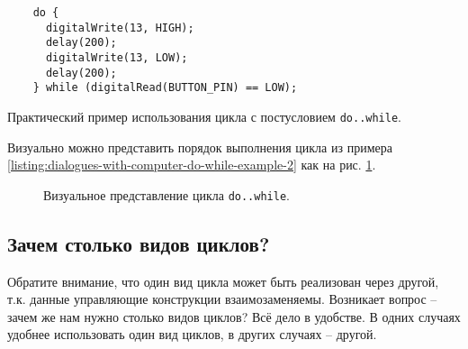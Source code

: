 \documentclass[../sparc.tex]{subfiles}
\begin{document}
\begin{listing}[ht]
  \begin{verbatim}
    do {
      digitalWrite(13, HIGH);
      delay(200);
      digitalWrite(13, LOW);
      delay(200);
    } while (digitalRead(BUTTON_PIN) == LOW);
  \end{verbatim}
  \label{listing:dialogues-with-computer-do-while-example-2}
  \caption{Практический пример использования цикла с постусловием
    \texttt{do..while}.}
\end{listing}

Визуально можно представить порядок выполнения цикла из примера
\ref{listing:dialogues-with-computer-do-while-example-2} как на
рис. \ref{fig:control-flow-do-while-loop}.

\begin{figure}[ht]
  \centering
  \label{fig:control-flow-do-while-loop}
  \caption{Визуальное представление цикла \texttt{do..while}.}
\end{figure}

\subsection{Зачем столько видов циклов?}

Обратите внимание, что один вид цикла может быть реализован через другой, т.к.
данные управляющие конструкции взаимозаменяемы. Возникает вопрос -- зачем же нам
нужно столько видов циклов? Всё дело в удобстве. В одних случаях удобнее
использовать один вид циклов, в других случаях -- другой.
\end{document}
